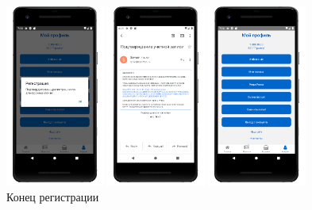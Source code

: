 \begin{figure}[!htb]\centering
    \begin{minipage}{0.19\textwidth}
        \centering

        \includegraphics[height=6cm]
        {images/mobile/registration/finish.png}
    \end{minipage}
    \begin{minipage}{0.19\textwidth}
        \centering

        \includegraphics[height=6cm]
        {images/mobile/registration/activation.png}
    \end{minipage}
    \begin{minipage}{0.19\textwidth}
        \centering

        \includegraphics[height=6cm]
        {images/mobile/registration/finish_account.png}
    \end{minipage}
    
    \caption{Конец регистрации}
    \label{fig:test_registration_step4}
\end{figure}

